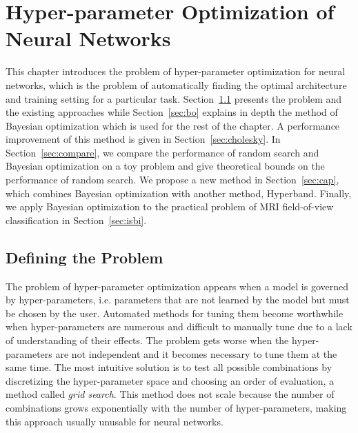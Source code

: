 \chapter{Hyper-parameter Optimization of Neural Networks}
\label{chap:hyperopt}

\begin{chapabstract}
This chapter introduces the problem of hyper-parameter optimization for neural networks, which is the problem of automatically finding the optimal architecture and training setting for a particular task. Section~\ref{sec:ho_lit} presents the problem and the existing approaches while Section~\ref{sec:bo} explains in depth the method of Bayesian optimization which is used for the rest of the chapter. A performance improvement of this method is given in Section~\ref{sec:cholesky}. In Section~\ref{sec:compare}, we compare the performance of random search and Bayesian optimization on a toy problem and give theoretical bounds on the performance of random search. We propose a new method in Section~\ref{sec:cap}, which combines Bayesian optimization with another method, Hyperband. Finally, we apply Bayesian optimization to the practical problem of MRI field-of-view classification in Section~\ref{sec:isbi}.
\end{chapabstract}

\vspace{1cm}

{   
    \minitoc
}

\newpage

\section{Defining the Problem}
\label{sec:ho_lit}

The problem of hyper-parameter optimization appears when a model is governed by hyper-parameters, i.e. parameters that are not learned by the model but must be chosen by the user. Automated methods for tuning them become worthwhile when hyper-parameters are numerous and difficult to manually tune due to a lack of understanding of their effects. The problem gets worse when the hyper-parameters are not independent and it becomes necessary to tune them at the same time. The most intuitive solution is to test all possible combinations by discretizing the hyper-parameter space and choosing an order of evaluation, a method called \textit{grid search}. This method does not scale because the number of combinations grows exponentially with the number of hyper-parameters, making this approach usually unusable for neural networks.

